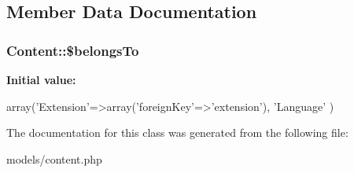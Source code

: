 \subsection{\-Member \-Data \-Documentation}
\hypertarget{class_content_a7bcb2bacab12e264da14d3df9bf0dc84}{
\subsubsection[{\$belongs\-To}]{\setlength{\rightskip}{0pt plus 5cm}\-Content\-::\$belongs\-To}}
\label{class_content_a7bcb2bacab12e264da14d3df9bf0dc84}
{\bfseries \-Initial value\-:}
\begin{DoxyCode}
 array('Extension'=>array('foreignKey'=>'extension'),
                           'Language'
                           )
\end{DoxyCode}


\-The documentation for this class was generated from the following file\-:\begin{DoxyCompactItemize}
\item 
models/content.\-php\end{DoxyCompactItemize}
